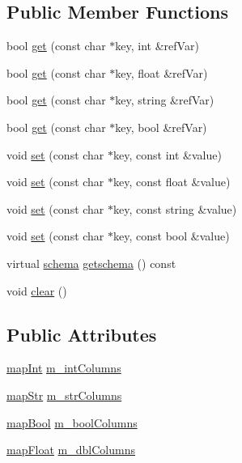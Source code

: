 \subsection*{Public Member Functions}
\begin{DoxyCompactItemize}
\item 
bool \mbox{\hyperlink{classColumns_a4467704e26d0899a5873df4a28978cd2}{get}} (const char $\ast$key, int \&ref\+Var)
\item 
bool \mbox{\hyperlink{classColumns_acc2d0655f5329b618cdb31c844214daa}{get}} (const char $\ast$key, float \&ref\+Var)
\item 
bool \mbox{\hyperlink{classColumns_a4cb8a06d153469b71aa4de37968d6277}{get}} (const char $\ast$key, string \&ref\+Var)
\item 
bool \mbox{\hyperlink{classColumns_adf2ef04de02351dcbb3ab7e1fed5a7fe}{get}} (const char $\ast$key, bool \&ref\+Var)
\item 
void \mbox{\hyperlink{classColumns_a878cae2a1f8d3ee9e3b3f8dfae5a4a10}{set}} (const char $\ast$key, const int \&value)
\item 
void \mbox{\hyperlink{classColumns_a2c67a52aadc3501d509ff03a4990cada}{set}} (const char $\ast$key, const float \&value)
\item 
void \mbox{\hyperlink{classColumns_a1c0dc9986943b8152fa80dd53277fbd0}{set}} (const char $\ast$key, const string \&value)
\item 
void \mbox{\hyperlink{classColumns_a5eb2a1336790ed61ff1593561ebf6736}{set}} (const char $\ast$key, const bool \&value)
\item 
virtual \mbox{\hyperlink{datadefinition_8h_aec40b8d2d2c045d8af617ce94864651f}{schema}} \mbox{\hyperlink{classColumns_aeb2cbb10de5358d5c1f411f327324c94}{getschema}} () const
\item 
void \mbox{\hyperlink{classColumns_a47d00e2daee2c85a40952509a542a911}{clear}} ()
\end{DoxyCompactItemize}
\subsection*{Public Attributes}
\begin{DoxyCompactItemize}
\item 
\mbox{\hyperlink{datadefinition_8h_aea73dfd4c959e6737c9c65474e4529ec}{map\+Int}} \mbox{\hyperlink{classColumns_a8cbc620473c96a5e587fec5a7d7be695}{m\+\_\+int\+Columns}}
\item 
\mbox{\hyperlink{datadefinition_8h_a9ada3c20f161f474bb963207a7f7bde5}{map\+Str}} \mbox{\hyperlink{classColumns_a2a592e1dfc29b2daed0013d085854aa3}{m\+\_\+str\+Columns}}
\item 
\mbox{\hyperlink{datadefinition_8h_a143e5002d845b09ca5dcaf1eda71d70f}{map\+Bool}} \mbox{\hyperlink{classColumns_a454542a78d6dc1013881e2c3abdbd9f7}{m\+\_\+bool\+Columns}}
\item 
\mbox{\hyperlink{datadefinition_8h_aeaff661fb97ce7aa76f32e7e308f3a15}{map\+Float}} \mbox{\hyperlink{classColumns_ac0b423f0dcaa97fe42e2a0283c13d9bc}{m\+\_\+dbl\+Columns}}
\end{DoxyCompactItemize}


